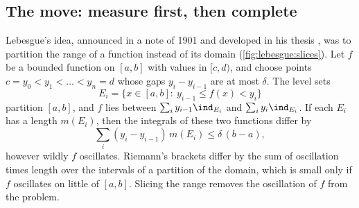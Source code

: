 \begin{refsection}
\section{The move: measure first, then complete}\label{sec:lebesgue:move}

Lebesgue's idea, announced in a note of 1901 and developed in his thesis \parencite{Lebesgue1901,Lebesgue1902}, was to partition the range of a function instead of its domain (\cref{fig:lebesgue:slices}). Let $f$ be a bounded function on $[a,b]$ with values in $[c,d)$, and choose points $c=y_0<y_1<\dots<y_n=d$ whose gaps $y_i-y_{i-1}$ are at most $\delta$. The level sets
\[
  E_i=\{x\in[a,b]:\ y_{i-1}\le f(x)<y_i\}
\]
partition $[a,b]$, and $f$ lies between $\sum_i y_{i-1}\ind_{E_i}$ and $\sum_i y_i\ind_{E_i}$. If each $E_i$ has a length $m(E_i)$, then the integrals of these two functions differ by
\[
  \sum_i(y_i-y_{i-1})\,m(E_i)\le\delta\,(b-a),
\]
however wildly $f$ oscillates. Riemann's brackets differ by the sum of oscillation times length over the intervals of a partition of the domain, which is small only if $f$ oscillates on little of $[a,b]$. Slicing the range removes the oscillation of $f$ from the problem.


\end{refsection}
